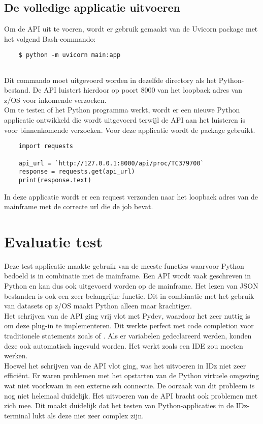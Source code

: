 \section{De volledige applicatie uitvoeren}
Om de API uit te voeren, wordt er gebruik gemaakt van de Uvicorn package met het volgend Bash-commando:

\begin{lstlisting}
    $ python -m uvicorn main:app
    
\end{lstlisting}
Dit commando moet uitgevoerd worden in dezelfde directory als het Python-bestand. De API luistert hierdoor op poort 8000 van het loopback adres van z/OS voor inkomende verzoeken. \\

Om te testen of het Python programma werkt, wordt er een nieuwe Python applicatie ontwikkeld die wordt uitgevoerd terwijl de API aan het luisteren is voor binnenkomende verzoeken. Voor deze applicatie wordt de  package gebruikt. 

\begin{lstlisting}
    import requests
    
    api_url = `http://127.0.0.1:8000/api/proc/TC379700`    
    response = requests.get(api_url)
    print(response.text)
\end{lstlisting}

In deze applicatie wordt er een request verzonden naar het loopback adres van de mainframe met de correcte url die de job  bevat. 

\chapter{Evaluatie test}
\label{ch:eval-test}
Deze test applicatie maakte gebruik van de meeste functies waarvoor Python bedoeld is in combinatie met de mainframe. Een API wordt vaak geschreven in Python en kan dus ook uitgevoerd worden op de mainframe. Het lezen van JSON bestanden is ook een zeer belangrijke functie. Dit in combinatie met het gebruik van datasets op z/OS maakt Python alleen maar krachtiger. \\

Het schrijven van de API ging vrij vlot met Pydev, waardoor het zeer nuttig is om deze plug-in te implementeren. Dit werkte perfect met code completion voor traditionele statements zoals  of . Als er variabelen gedeclareerd werden, konden deze ook automatisch ingevuld worden. Het werkt zoals een IDE zou moeten werken. \\

Hoewel het schrijven van de API vlot ging, was het uitvoeren in IDz niet zeer efficiënt. Er waren problemen met het opstarten van de Python virtuele omgeving wat niet voorkwam in een externe ssh connectie. De oorzaak van dit probleem is nog niet helemaal duidelijk. Het uitvoeren van de API bracht ook problemen met zich mee. Dit maakt duidelijk dat het testen van Python-applicaties in de IDz-terminal lukt als deze niet zeer complex zijn.







